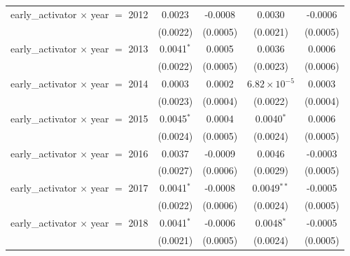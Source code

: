 \begin{tabular}{lcccc}
   early\_activator $\times$ year $=$ 2012               & 0.0023                 & -0.0008                   & 0.0030                 & -0.0006\\   
                                                         & (0.0022)               & (0.0005)                  & (0.0021)               & (0.0005)\\   
   early\_activator $\times$ year $=$ 2013               & 0.0041$^{*}$           & 0.0005                    & 0.0036                 & 0.0006\\   
                                                         & (0.0022)               & (0.0005)                  & (0.0023)               & (0.0006)\\   
   early\_activator $\times$ year $=$ 2014               & 0.0003                 & 0.0002                    & $6.82\times 10^{-5}$   & 0.0003\\   
                                                         & (0.0023)               & (0.0004)                  & (0.0022)               & (0.0004)\\   
   early\_activator $\times$ year $=$ 2015               & 0.0045$^{*}$           & 0.0004                    & 0.0040$^{*}$           & 0.0006\\   
                                                         & (0.0024)               & (0.0005)                  & (0.0024)               & (0.0005)\\   
   early\_activator $\times$ year $=$ 2016               & 0.0037                 & -0.0009                   & 0.0046                 & -0.0003\\   
                                                         & (0.0027)               & (0.0006)                  & (0.0029)               & (0.0005)\\   
   early\_activator $\times$ year $=$ 2017               & 0.0041$^{*}$           & -0.0008                   & 0.0049$^{**}$          & -0.0005\\   
                                                         & (0.0022)               & (0.0006)                  & (0.0024)               & (0.0005)\\   
   early\_activator $\times$ year $=$ 2018               & 0.0041$^{*}$           & -0.0006                   & 0.0048$^{*}$           & -0.0005\\   
                                                         & (0.0021)               & (0.0005)                  & (0.0024)               & (0.0005)\\   

\end{tabular}

